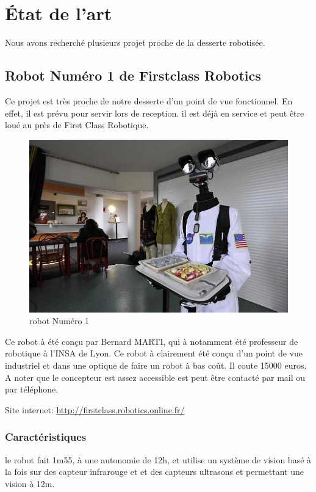 \section*{\'Etat de l'art}
Nous avons recherché plusieurs projet proche de la desserte robotisée.

\subsection*{Robot Numéro 1 de Firstclass Robotics}
Ce projet est très proche de notre desserte d'un point de vue
fonctionnel. En effet, il est prévu pour servir lors de reception. il
est déjà en service et peut être loué au près de First Class
Robotique.

\begin{figure}[h]
\begin{center}
\includegraphics[scale=0.55]{Images/robot_n1.jpg}
\caption{robot Numéro 1}
\label{robot Numéro 1}
\end{center}
\end{figure} 

Ce robot à été conçu par Bernard MARTI, qui à notamment été professeur
de robotique à l'INSA de Lyon. Ce robot à clairement été conçu d'un
point de vue industriel et dans une optique de faire un robot à bas
coût. Il coute 15000 euros.  A noter que le concepteur est assez
accessible est peut être contacté par mail ou par téléphone.

Site internet: \url{http://firstclass.robotics.online.fr/}

\subsubsection*{Caractéristiques}
le robot fait 1m55, à une autonomie de 12h, et utilise un système de
vision basé à la fois sur des capteur infrarouge et et des capteurs
ultrasons et permettant une vision à 12m.

